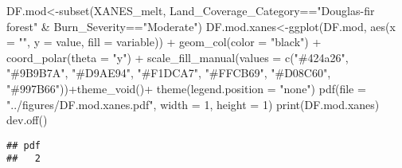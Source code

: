 \documentclass[
]{article}
\newenvironment{Shaded}{\begin{snugshade}}{\end{snugshade}}
\newcommand{\AttributeTok}[1]{\textcolor[rgb]{0.77,0.63,0.00}{#1}}
\newcommand{\DecValTok}[1]{\textcolor[rgb]{0.00,0.00,0.81}{#1}}
\newcommand{\FunctionTok}[1]{\textcolor[rgb]{0.00,0.00,0.00}{#1}}
\newcommand{\NormalTok}[1]{#1}
\newcommand{\OtherTok}[1]{\textcolor[rgb]{0.56,0.35,0.01}{#1}}
\newcommand{\SpecialCharTok}[1]{\textcolor[rgb]{0.00,0.00,0.00}{#1}}
\newcommand{\StringTok}[1]{\textcolor[rgb]{0.31,0.60,0.02}{#1}}
\begin{document}
\begin{Shaded}
\begin{Highlighting}[]
\NormalTok{DF.mod}\OtherTok{\textless{}{-}}\FunctionTok{subset}\NormalTok{(XANES\_melt, Land\_Coverage\_Category}\SpecialCharTok{==}\StringTok{"Douglas{-}fir forest"} \SpecialCharTok{\&}\NormalTok{ Burn\_Severity}\SpecialCharTok{==}\StringTok{"Moderate"}\NormalTok{)}
\NormalTok{DF.mod.xanes}\OtherTok{\textless{}{-}}\FunctionTok{ggplot}\NormalTok{(DF.mod, }\FunctionTok{aes}\NormalTok{(}\AttributeTok{x =} \StringTok{""}\NormalTok{, }\AttributeTok{y =}\NormalTok{ value, }\AttributeTok{fill =}\NormalTok{ variable)) }\SpecialCharTok{+}
    \FunctionTok{geom\_col}\NormalTok{(}\AttributeTok{color =} \StringTok{"black"}\NormalTok{) }\SpecialCharTok{+}
    \FunctionTok{coord\_polar}\NormalTok{(}\AttributeTok{theta =} \StringTok{"y"}\NormalTok{) }\SpecialCharTok{+} \FunctionTok{scale\_fill\_manual}\NormalTok{(}\AttributeTok{values =} \FunctionTok{c}\NormalTok{(}\StringTok{"\#424a26"}\NormalTok{, }\StringTok{"\#9B9B7A"}\NormalTok{, }\StringTok{"\#D9AE94"}\NormalTok{, }\StringTok{"\#F1DCA7"}\NormalTok{, }\StringTok{"\#FFCB69"}\NormalTok{, }\StringTok{"\#D08C60"}\NormalTok{, }\StringTok{"\#997B66"}\NormalTok{))}\SpecialCharTok{+}\FunctionTok{theme\_void}\NormalTok{()}\SpecialCharTok{+}
    \FunctionTok{theme}\NormalTok{(}\AttributeTok{legend.position =} \StringTok{"none"}\NormalTok{)}
\FunctionTok{pdf}\NormalTok{(}\AttributeTok{file =} \StringTok{"../figures/DF.mod.xanes.pdf"}\NormalTok{, }\AttributeTok{width =} \DecValTok{1}\NormalTok{, }\AttributeTok{height =} \DecValTok{1}\NormalTok{) }
\FunctionTok{print}\NormalTok{(DF.mod.xanes)}
\FunctionTok{dev.off}\NormalTok{()}
\end{Highlighting}
\end{Shaded}

\begin{verbatim}
## pdf 
##   2
\end{verbatim}
\end{document}
